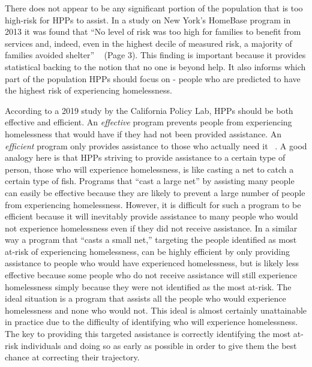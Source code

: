 \documentclass[10pt,letterpaper]{article}
\begin{document}
There does not appear to be any significant portion of the population that is too high-risk for HPPs to assist. In a study on New York's HomeBase program in 2013 it was found that ``No level of risk was too high for families to benefit from services and, indeed, even in the highest decile of measured risk, a majority of families avoided shelter'' ~\cite{shinn2013efficient} (Page 3). This finding is important because it provides statistical backing to the notion that no one is beyond help. It also informs which part of the population HPPs should focus on - people who are predicted to have the highest risk of experiencing homelessness.

According to a 2019 study by the California Policy Lab, HPPs should be both effective and efficient. An \textit{effective} program prevents people from experiencing homelessness that would have if they had not been provided assistance. An \textit{efficient} program only provides assistance to those who actually need it ~\cite{von2019predicting}. A good analogy here is that HPPs striving to provide assistance to a certain type of person, those who will experience homelessness, is like casting a net to catch a certain type of fish. Programs that ``cast a large net'' by assisting many people can easily be effective because they are likely to prevent a large number of people from experiencing homelessness. However, it is difficult for such a program to be efficient because it will inevitably provide assistance to many people who would not experience homelessness even if they did not receive assistance. In a similar way a program that ``casts a small net,'' targeting the people identified as most at-risk of experiencing homelessness, can be highly efficient by only providing assistance to people who would have experienced homelessness, but is likely less effective because some people who do not receive assistance will still experience homelessness simply because they were not identified as the most at-risk. The ideal situation is a program that assists all the people who would experience homelessness and none who would not. This ideal is almost certainly unattainable in practice due to the difficulty of identifying who will experience homelessness. The key to providing this targeted assistance is correctly identifying the most at-risk individuals and doing so as early as possible in order to give them the best chance at correcting their trajectory.
\end{document}
